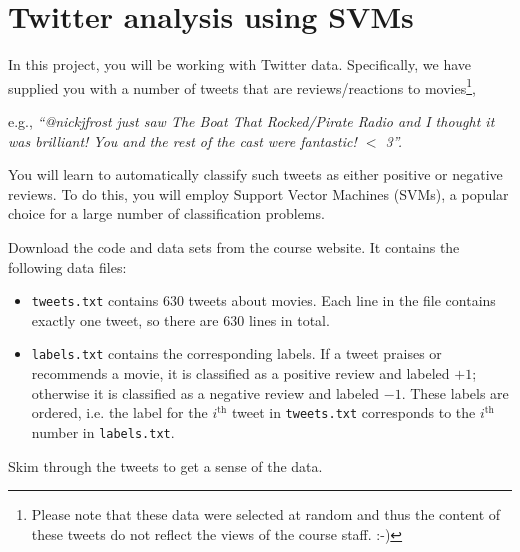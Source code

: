 \documentclass[11pt]{article}
\begin{document}
\section{Twitter analysis using SVMs }\label{sec:intro}

In this project, you will be working with Twitter data. Specifically, we have supplied you with a number of tweets that are reviews/reactions to movies\footnote{Please note that these data were selected at random and thus the content of these tweets do not reflect the views of the course staff. :-)},

e.g., \textit{``@nickjfrost just saw The Boat That Rocked/Pirate Radio and I thought it was brilliant! You and the rest of the cast were fantastic! $<$ 3''.}

You will learn to automatically classify such tweets as either positive or negative reviews. To do this, you will employ Support Vector Machines (SVMs), a popular choice for a large number of classification problems.

Download the code and data sets from the course website. It contains the following data files:
\begin{itemize}[nosep]
\item \verb|tweets.txt| contains 630 tweets about movies. Each line in the file contains exactly one tweet, so there are 630 lines in total.
\item \verb|labels.txt| contains the corresponding labels. If a tweet praises or recommends a movie, it is classified as a positive review and labeled $+1$; otherwise it is classified as a negative review and labeled $-1$. These labels are ordered, i.e. the label for the $i^\textrm{th}$ tweet in \verb|tweets.txt| corresponds to the $i^\textrm{th}$ number in \verb|labels.txt|.
\end{itemize}
Skim through the tweets to get a sense of the data.
\end{document}
